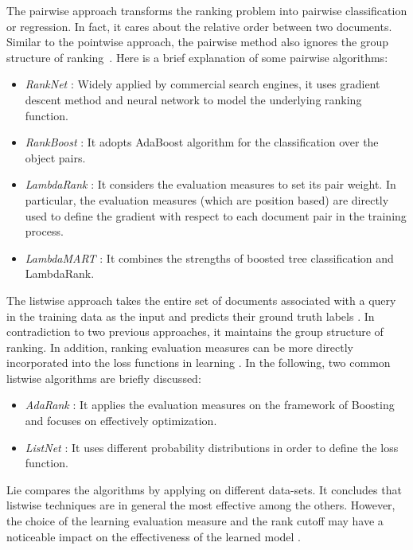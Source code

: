 The pairwise approach transforms the ranking problem into pairwise classification or regression. In fact, it cares about the relative order between two documents. Similar to the pointwise approach, the pairwise method also ignores the group structure of ranking~\cite{l2r-intro}. Here is a brief explanation of some pairwise algorithms:

\begin{itemize}
\item \textit{RankNet} \cite{l2r-ranknet}: Widely applied by commercial search engines, it uses gradient descent method and neural network to model the underlying ranking function.
\item \textit{RankBoost} \cite{l2r-rankboost}: It adopts AdaBoost algorithm for the classification over the object pairs.
\item \textit{LambdaRank} \cite{l2r-lambdarank}: It considers the evaluation measures to set its pair weight. In particular, the evaluation measures (which are position based) are directly used to define the gradient with respect to each document pair in the training process.
\item \textit{LambdaMART} \cite{l2r-lambdamart}: It combines the strengths of boosted tree classification and LambdaRank.
\end{itemize}

The listwise approach takes the entire set of documents associated with a query in the training data as the input and predicts their ground truth labels \cite{l2r-book}. In contradiction to two previous approaches, it maintains the group structure of ranking. In addition, ranking evaluation measures can be more directly incorporated into the loss functions in learning \cite{l2r-intro}. In the following, two common listwise algorithms are briefly discussed:

\begin{itemize}
\item \textit{AdaRank} \cite{l2r-adarank}: It applies the evaluation measures on the framework of Boosting and focuses on effectively optimization.
\item \textit{ListNet} \cite{l2r-listnet}: It uses different probability distributions in order to define the loss function.
\end{itemize}

Lie \cite{l2r-book} compares the algorithms by applying on different data-sets. It concludes that listwise techniques are in general the most effective among the others. However, the choice of the learning evaluation measure and the rank cutoff may have a noticeable impact on the effectiveness of the learned model \cite{l2r-when}.

